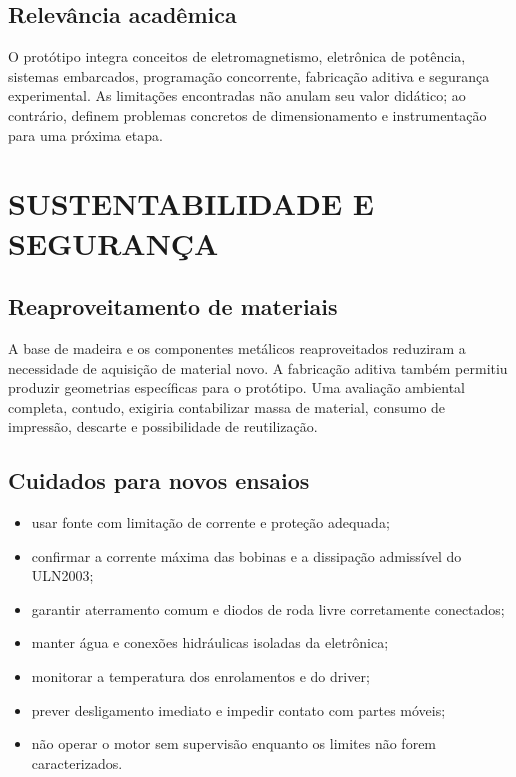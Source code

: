 \documentclass[12pt,a4paper,oneside]{article}
\begin{document}
\subsection{Relevância acadêmica}

O protótipo integra conceitos de eletromagnetismo, eletrônica de potência, sistemas embarcados, programação concorrente, fabricação aditiva e segurança experimental. As limitações encontradas não anulam seu valor didático; ao contrário, definem problemas concretos de dimensionamento e instrumentação para uma próxima etapa.

\section{SUSTENTABILIDADE E SEGURANÇA}

\subsection{Reaproveitamento de materiais}

A base de madeira e os componentes metálicos reaproveitados reduziram a necessidade de aquisição de material novo. A fabricação aditiva também permitiu produzir geometrias específicas para o protótipo. Uma avaliação ambiental completa, contudo, exigiria contabilizar massa de material, consumo de impressão, descarte e possibilidade de reutilização.

\subsection{Cuidados para novos ensaios}

\begin{itemize}
  \item usar fonte com limitação de corrente e proteção adequada;
  \item confirmar a corrente máxima das bobinas e a dissipação admissível do ULN2003;
  \item garantir aterramento comum e diodos de roda livre corretamente conectados;
  \item manter água e conexões hidráulicas isoladas da eletrônica;
  \item monitorar a temperatura dos enrolamentos e do driver;
  \item prever desligamento imediato e impedir contato com partes móveis;
  \item não operar o motor sem supervisão enquanto os limites não forem caracterizados.
\end{itemize}
\end{document}
